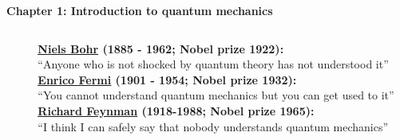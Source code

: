 \renewcommand{\theequation}{1.\arabic{equation}}

\begin{frame}
\begin{center}
{\bf Chapter 1: Introduction to quantum mechanics}\\
\end{center}

\scriptsize

\begin{columns}
\begin{column}{2cm}


\end{column}
\begin{column}{8cm}
\textbf{\href{http://en.wikipedia.org/wiki/Niels_Bohr}{\underline{Niels Bohr}} (1885 - 1962; Nobel prize 1922):}\\
``Anyone who is not shocked by quantum theory has not understood it''\\
\vspace*{1.5cm}
\textbf{\href{http://en.wikipedia.org/wiki/Enrico_Fermi}{\underline{Enrico Fermi}} (1901 - 1954; Nobel prize 1932):}\\
``You cannot understand quantum mechanics but you can get used to it''\\
\vspace*{1.5cm}
\textbf{\href{http://en.wikipedia.org/wiki/Richard_Feynman}{\underline{Richard Feynman}} (1918-1988; Nobel prize 1965):}\\
``I think I can safely say that nobody understands quantum mechanics''\\

\end{column}
\end{columns}
\end{frame}

\scriptsize















